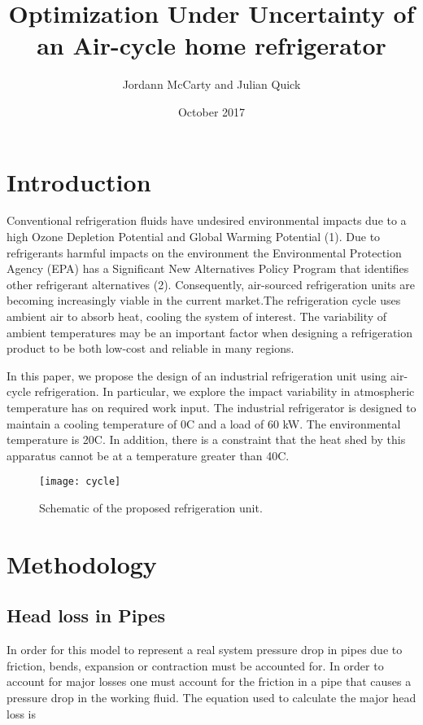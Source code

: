 \documentclass{article}
\title{Optimization Under Uncertainty of an Air-cycle home refrigerator }
\author{Jordann McCarty and Julian Quick}
\date{October 2017}
\begin{document}
\maketitle

\section{Introduction}

Conventional refrigeration fluids have undesired environmental impacts due to a high Ozone Depletion Potential and Global Warming Potential (1).  Due to refrigerants harmful impacts on the environment the Environmental Protection Agency (EPA) has a Significant New Alternatives Policy Program that identifies other refrigerant alternatives (2). Consequently, air-sourced refrigeration units are becoming increasingly viable in the current market.The refrigeration cycle uses ambient air to absorb heat, cooling the system of interest. The variability of ambient temperatures may be an important factor when designing a refrigeration product to be both low-cost and reliable in many regions. 

In this paper, we propose the design of an industrial refrigeration unit using air-cycle refrigeration. In particular, we explore the impact variability in atmospheric temperature has on required work input. The industrial refrigerator is designed to maintain a cooling temperature of 0\degree C and a load of 60 kW. The environmental temperature is 20\degree C. In addition, there is a constraint that the heat shed by this apparatus cannot be at a temperature greater than 40\degree C.

\begin{figure}[htb!]
\centering
\texttt{[image: cycle]}
\caption{\label{fig:cycle} Schematic of the proposed refrigeration unit.}
\end{figure}

\section{Methodology}

\subsection {Head loss in Pipes}
 In order for this model to represent a real system pressure drop in pipes due to friction, bends, expansion or contraction must be accounted for. In order to account for major losses one must account for the friction in a pipe that causes a pressure drop in the working fluid. The equation used to calculate the major head loss is 
\end{document}
